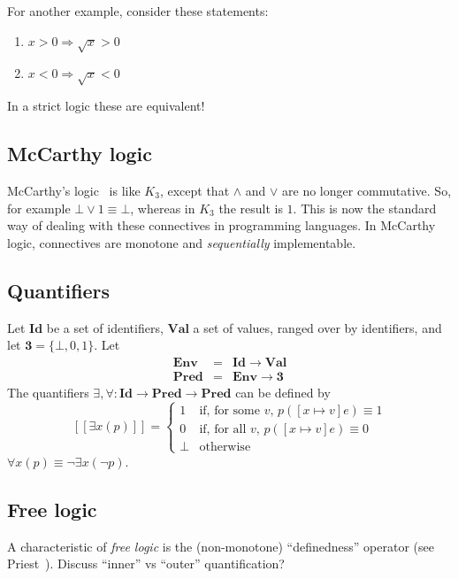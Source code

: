 \documentclass{llncs}
\newcommand{\fun}{\rightarrow}
\newcommand{\impl}{\mathbin{\Rightarrow}}
\newcommand{\Tri}{\mathbf{3}}
\newcommand{\Id}{\mathbf{Id}}
\newcommand{\Val}{\mathbf{Val}}
\newcommand{\Pred}{\mathbf{Pred}}
\newcommand{\Env}{\mathbf{Env}}
\def\lquote     {[\![}
\def\rquote     {]\!]}
\newcommand{\qquote}[1]{\lquote #1 \rquote}
\begin{document}
For another example, consider these statements:
\begin{enumerate}
\item
$x > 0 \impl \sqrt{x} > 0$
\item
$x < 0 \impl \sqrt{x} < 0$
\end{enumerate}
In a strict logic these are equivalent!


\subsection{McCarthy logic}

McCarthy's logic~\cite{McCarthy:FormalBasis63}
is like $K_3$, except that $\land$ and $\lor$
are no longer commutative.
So, for example $\bot \lor 1 \equiv \bot$, whereas in 
$K_3$ the result is $1$.
This is now the standard way of dealing with these connectives in
programming languages.
In McCarthy logic,
connectives are monotone and \emph{sequentially} implementable.

\subsection{Quantifiers}

Let $\Id$ be a set of identifiers, $\Val$ a set of values,
ranged over by identifiers, and let $\Tri = \{\bot,0,1\}$.
Let
\[
\begin{array}{lcl}
   \Env &=& \Id \fun \Val
\\ \Pred &=& \Env \fun \Tri
\end{array}
\]
The quantifiers $\exists, \forall : \Id \fun \Pred \fun \Pred$
can be defined by
\[
  \qquote{\exists x(p)} = 
    \left\{
	\begin{array}{ll}
           1 & \mbox{if, for some $v$, $p([x \mapsto v]e) \equiv 1$}
        \\ 0 & \mbox{if, for all $v$, $p([x \mapsto v]e) \equiv 0$}
        \\ \bot & \mbox{otherwise}
	\end{array}
    \right.
\]
$\forall x(p) \equiv \neg \exists x (\neg p)$.

\subsection{Free logic}

A characteristic of \emph{free logic} is the (non-monotone)
``definedness'' operator (see Priest~\cite{Priest08}).
Discuss ``inner'' vs ``outer'' quantification?
\end{document}
